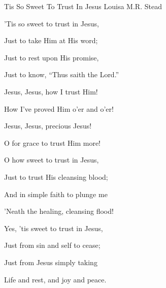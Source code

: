 \documentclass[12pt]{book}
\begin{document}
\begin{song}{Tis So Sweet To Trust In Jesus}{}
  {\SBPubDom}
  {Louisa M.R. Stead}
  {}
  {}

  \begin{SBVerse}
    'Tis so sweet to trust in Jesus,

    Just to take Him at His word;

    Just to rest upon His promise,

    Just to know, ``Thus saith the Lord.''
  \end{SBVerse}

  \begin{SBOpGroup}
    Jesus, Jesus, how I trust Him!

    How I've proved Him o'er and o'er!

    Jesus, Jesus, precious Jesus!

    O for grace to trust Him more!
  \end{SBOpGroup}

  \begin{SBVerse}
    O how sweet to trust in Jesus,

    Just to trust His cleansing blood;

    And in simple faith to plunge me

    'Neath the healing, cleansing flood!
  \end{SBVerse}

  \begin{SBVerse}
    Yes, 'tis sweet to trust in Jesus,

    Just from sin and self to cease;

    Just from Jesus simply taking

    Life and rest, and joy and peace.
  \end{SBVerse}
\end{song}
\end{document}
